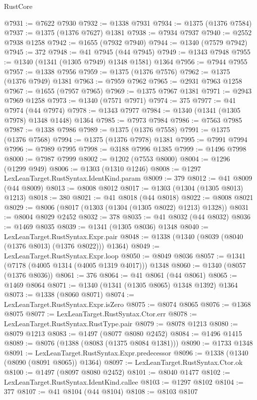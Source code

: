 \begin{lexlean}{RustCore}
\begin{coremodule}
@7931 := @7622 @7930
@7932 := @1338 @7931
@7934 := @1375 (@1376 @7584)
@7937 := @1375 (@1376 @7627) @1381
@7938 := @7934 @7937
@7940 := @2552 @7938 @1258
@7942 := @1655 (@7932 @7940)
@7944 := @1340 (@7579 @7942)
@7945 := 372
@7948 := @41 @7945 (@44 @7945)
@7949 := @1343 @7948
@7955 := @1340 (@1341 (@1305 @7949) @1348 @1581) @1364
@7956 := @7944 @7955
@7957 := @1338 @7956
@7959 := @1375 (@1376 @7576)
@7962 := @1375 (@1376 @7949) @1381
@7963 := @7959 @7962
@7965 := @2931 @7963 @1258
@7967 := @1655 (@7957 @7965)
@7969 := @1375 @7967 @1381
@7971 := @2943 @7969 @1258
@7973 := @1340 (@7571 @7971)
@7974 := 375
@7977 := @41 @7974 (@44 @7974)
@7978 := @1343 @7977
@7984 := @1340 (@1341 (@1305 @7978) @1348 @1448) @1364
@7985 := @7973 @7984
@7986 := @7563 @7985
@7987 := @1338 @7986
@7989 := @1375 (@1376 @7558)
@7991 := @1375 (@1376 @7568)
@7994 := @1375 (@1376 @7978) @1381
@7995 := @7991 @7994
@7996 := @7989 @7995
@7998 := @3188 @7996 @1385
@7999 := @1496 @7998
@8000 := @7987 @7999
@8002 := @1202 (@7553 @8000)
@8004 := @1296 (@1299 @949)
@8006 := @1303 (@1310 @1246)
@8008 := @1297 LexLeanTarget.RustSyntax.IdentKind.param
@8009 := 379
@8012 := @41 @8009 (@44 @8009)
@8013 := @8008 @8012
@8017 := @1303 (@1304 (@1305 @8013) @1213)
@8018 := 380
@8021 := @41 @8018 (@44 @8018)
@8022 := @8008 @8021
@8029 := @8006 (@8017 (@1303 (@1304 (@1305 @8022) @1213) @1328))
@8031 := @8004 @8029 @2452
@8032 := 378
@8035 := @41 @8032 (@44 @8032)
@8036 := @1469 @8035
@8039 := @1341 (@1305 @8036) @1348
@8040 := LexLeanTarget.RustSyntax.Expr.pair
@8048 := @1338 (@1340 (@8039 (@8040 (@1376 @8013) (@1376 @8022))) @1364)
@8049 := LexLeanTarget.RustSyntax.Expr.loop
@8050 := @8049 @8036
@8057 := @1341 (@7178 (@4005 @1314 (@4005 @1319 @4017))) @1348
@8060 := @1340 (@8057 (@1376 @8036))
@8061 := 376
@8064 := @41 @8061 (@44 @8061)
@8065 := @1469 @8064
@8071 := @1340 (@1341 (@1305 @8065) @1348 @1392) @1364
@8073 := @1338 (@8060 @8071)
@8074 := LexLeanTarget.RustSyntax.Expr.isZero
@8075 := @8074 @8065
@8076 := @1368 @8075
@8077 := LexLeanTarget.RustSyntax.Ctor.err
@8078 := LexLeanTarget.RustSyntax.RustType.pair
@8079 := @8078 @1213
@8080 := @8079 @1213
@8083 := @1497 (@8077 @8080 @2452)
@8084 := @1496 @1415
@8089 := @8076 (@1388 (@8083 (@1375 @8084 @1381)))
@8090 := @1733 @1348
@8091 := LexLeanTarget.RustSyntax.Expr.predecessor
@8096 := @1338 (@1340 (@8090 (@8091 @8065)) @1364)
@8097 := LexLeanTarget.RustSyntax.Ctor.ok
@8100 := @1497 (@8097 @8080 @2452)
@8101 := @8040 @1477
@8102 := LexLeanTarget.RustSyntax.IdentKind.callee
@8103 := @1297 @8102
@8104 := 377
@8107 := @41 @8104 (@44 @8104)
@8108 := @8103 @8107

\end{coremodule}
\end{lexlean}
